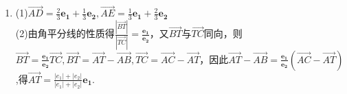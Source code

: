 \documentclass[UTF8]{ctexart}
\begin{document}
\begin{enumerate}
\item (1)$\overrightarrow{AD}=\displaystyle\frac{2}{3}\mathbf{e_1}+\displaystyle\frac{1}{3}\mathbf{e_2},\overrightarrow{AE}=\displaystyle\frac{1}{3}\mathbf{e_1}+\displaystyle\frac{2}{3}\mathbf{e_2}$\\
(2)由角平分线的性质得$\displaystyle\frac{\left|\overrightarrow{BT}\right|}{\left|\overrightarrow{TC}\right|}=\displaystyle\frac{\mathbf{e_1}}{\mathbf{e_2}}$，又$\overrightarrow{BT}$与$\overrightarrow{TC}$同向，则$\overrightarrow{BT}=\displaystyle\frac{\mathbf{e_1}}{\mathbf{e_2}}\overrightarrow{TC},\overrightarrow{BT}=\overrightarrow{AT}-\overrightarrow{AB},\overrightarrow{TC}=\overrightarrow{AC}-\overrightarrow{AT}$，因此$\overrightarrow{AT}-\overrightarrow{AB}=\displaystyle\frac{\mathbf{e_1}}{\mathbf{e_2}}\left(\overrightarrow{AC}-\overrightarrow{AT}\right)$,得$\overrightarrow{AT}=\displaystyle\frac{\left|e_1\right|+\left|e_2\right|}{\left|e_1\right|+\left|e_2\right|}\mathbf{e_1}$. 
\end{enumerate}
\end{document}
